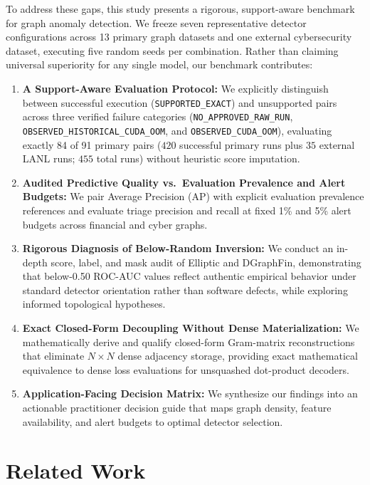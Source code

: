\documentclass[applsci,article,submit,moreauthors,pdftex]{Definitions/mdpi}
\begin{document}
To address these gaps, this study presents a rigorous, support-aware benchmark for graph anomaly detection. We freeze seven representative detector configurations across 13 primary graph datasets and one external cybersecurity dataset, executing five random seeds per combination. Rather than claiming universal superiority for any single model, our benchmark contributes:
\begin{enumerate}
    \item \textbf{A Support-Aware Evaluation Protocol:} We explicitly distinguish between successful execution (\texttt{SUPPORTED\_EXACT}) and unsupported pairs across three verified failure categories (\texttt{NO\_APPROVED\_RAW\_RUN}, \texttt{OBSERVED\_HISTORICAL\_CUDA\_OOM}, and \texttt{OBSERVED\_CUDA\_OOM}), evaluating exactly 84 of 91 primary pairs ($420$ successful primary runs plus $35$ external LANL runs; $455$ total runs) without heuristic score imputation.
    \item \textbf{Audited Predictive Quality vs.\ Evaluation Prevalence and Alert Budgets:} We pair Average Precision (AP) with explicit evaluation prevalence references and evaluate triage precision and recall at fixed 1\% and 5\% alert budgets across financial and cyber graphs.
    \item \textbf{Rigorous Diagnosis of Below-Random Inversion:} We conduct an in-depth score, label, and mask audit of Elliptic and DGraphFin, demonstrating that below-0.50 ROC-AUC values reflect authentic empirical behavior under standard detector orientation rather than software defects, while exploring informed topological hypotheses.
    \item \textbf{Exact Closed-Form Decoupling Without Dense Materialization:} We mathematically derive and qualify closed-form Gram-matrix reconstructions that eliminate $N \times N$ dense adjacency storage, providing exact mathematical equivalence to dense loss evaluations for unsquashed dot-product decoders.
    \item \textbf{Application-Facing Decision Matrix:} We synthesize our findings into an actionable practitioner decision guide that maps graph density, feature availability, and alert budgets to optimal detector selection.
\end{enumerate}

\section{Related Work}
\label{sec:related}
\end{document}
